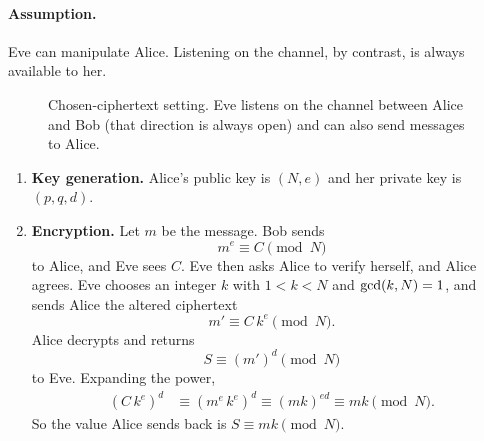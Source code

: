 \paragraph{Assumption.}
Eve can manipulate Alice.
Listening on the channel, by contrast, is always available to her.

\begin{figure}[H]
\centering
{}
\caption{Chosen-ciphertext setting. Eve listens on the channel between Alice and Bob (that direction is always open) and can also send messages to Alice.}
\end{figure}

\begin{enumerate}[leftmargin=1.6em]
    \item \textbf{Key generation.}
    Alice's public key is $(N,e)$ and her private key is $(p,q,d)$.
    \item \textbf{Encryption.}
    Let $m$ be the message. Bob sends
    \[
        m^{e}\equiv C\pmod{N}
    \]
    to Alice, and Eve sees $C$. Eve then asks Alice to verify herself, and Alice agrees. Eve chooses an integer $k$ with $1<k<N$ and $\operatorname{gcd}(k,N)=1$, and sends Alice the altered ciphertext
    \[
        m'\equiv C\,k^{e}\pmod{N}.
    \]
    Alice decrypts and returns
    \[
        S\equiv (m')^{d}\pmod{N}
    \]
    to Eve. Expanding the power,
    \begin{align*}
        (C\,k^{e})^{d}
        &\equiv (m^{e}\,k^{e})^{d}
        \equiv (mk)^{ed}
        \equiv mk \pmod{N}.
    \end{align*}
    So the value Alice sends back is $S\equiv mk\pmod{N}$.
\end{enumerate}
